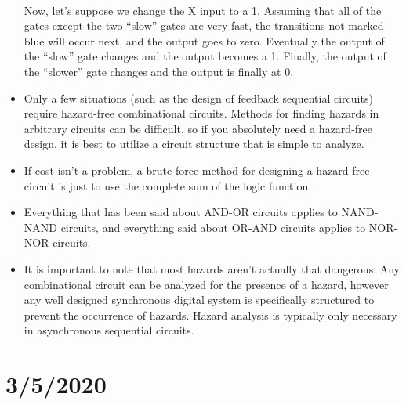 \documentclass[10pt,a4paper]{article}
\begin{document}
\begin{itemize}
\\
Now, let's suppose we change the X input to a 1. Assuming that all of the gates except the two ``slow'' gates are very fast, the transitions not marked blue will occur next, and the output goes to zero. Eventually the output of the ``slow'' gate changes and the output becomes a 1. Finally, the output of the ``slower'' gate changes and the output is finally at 0. 
\item Only a few situations (such as the design of feedback sequential circuits) require hazard-free combinational circuits. Methods for finding hazards in arbitrary circuits can be difficult, so if you absolutely need a hazard-free design, it is best to utilize a circuit structure that is simple to analyze. 
\item If cost isn't a problem, a brute force method for designing a hazard-free circuit is just to use the complete sum of the logic function. 
\item Everything that has been said about AND-OR circuits applies to NAND-NAND circuits, and everything said about OR-AND circuits applies to NOR-NOR circuits.
\item It is important to note that most hazards aren't actually that dangerous. Any combinational circuit can be analyzed for the presence of a hazard, however any well designed synchronous digital system is specifically structured to prevent the occurrence of hazards. Hazard analysis is typically only necessary in asynchronous sequential circuits. 
\end{itemize}
\pagebreak
\section{3/5/2020}
\end{document}
